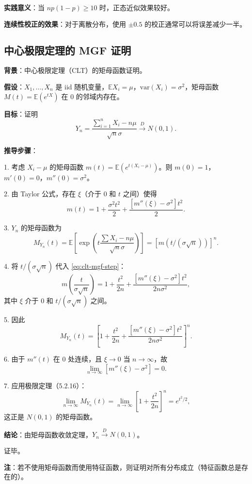 \textbf{实践意义}：当 $np(1-p) \geq 10$ 时，正态近似效果较好。

\textbf{连续性校正的效果}：对于离散分布，使用 $\pm 0.5$ 的校正通常可以将误差减少一半。

\subsection{中心极限定理的 MGF 证明}\label{sec:clt-proof}

\textbf{背景}：中心极限定理（CLT）的矩母函数证明。

\textbf{假设}：$X_1, \ldots, X_n$ 是 iid 随机变量，$\mathbb{E}X_i = \mu$，$\text{var}(X_i) = \sigma^2$，矩母函数 $M(t) = \mathbb{E}(e^{tX})$ 在 $0$ 的邻域内存在。

\textbf{目标}：证明
\[
Y_n = \frac{\sum_{i=1}^n X_i - n\mu}{\sqrt{n}\sigma} \xrightarrow{D} N(0,1).
\]

\textbf{推导步骤}：

1. 考虑 $X_i - \mu$ 的矩母函数 $m(t) = \mathbb{E}(e^{t(X_i - \mu)})$。则 $m(0) = 1$，$m'(0) = 0$，$m''(0) = \sigma^2$。

2. 由 Taylor 公式，存在 $\xi$（介于 $0$ 和 $t$ 之间）使得
\[
m(t) = 1 + \frac{\sigma^2 t^2}{2} + \frac{[m''(\xi) - \sigma^2]t^2}{2}.
\label{eq:clt-mgf-step}
\]

3. $Y_n$ 的矩母函数为
\[
M_{Y_n}(t) = \mathbb{E}\left[\exp\left(t\frac{\sum X_i - n\mu}{\sqrt{n}\sigma}\right)\right] = [m(t/(\sigma\sqrt{n}))]^n.
\label{eq:clt-mgf}
\]

4. 将 $t/(\sigma\sqrt{n})$ 代入 \eqref{eq:clt-mgf-step}：
\[
m\left(\frac{t}{\sigma\sqrt{n}}\right) = 1 + \frac{t^2}{2n} + \frac{[m''(\xi) - \sigma^2]t^2}{2n\sigma^2},
\]
其中 $\xi$ 介于 $0$ 和 $t/(\sigma\sqrt{n})$ 之间。

5. 因此
\[
M_{Y_n}(t) = \left[1 + \frac{t^2}{2n} + \frac{[m''(\xi) - \sigma^2]t^2}{2n\sigma^2}\right]^n.
\]

6. 由于 $m''(t)$ 在 $0$ 处连续，且 $\xi \to 0$ 当 $n \to \infty$，故
\[
\lim_{n \to \infty} [m''(\xi) - \sigma^2] = 0.
\]

7. 应用极限定理（5.2.16）：
\[
\lim_{n \to \infty} M_{Y_n}(t) = \lim_{n \to \infty} \left[1 + \frac{t^2}{2n}\right]^n = e^{t^2/2},
\]
这正是 $N(0,1)$ 的矩母函数。

\textbf{结论}：由矩母函数收敛定理，$Y_n \xrightarrow{D} N(0,1)$。

证毕。

\textbf{注}：若不使用矩母函数而使用特征函数，则证明对所有分布成立（特征函数总是存在的）。

